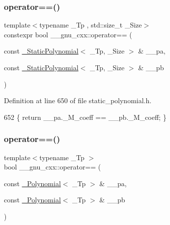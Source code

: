 \subsubsection{\texorpdfstring{operator==()}{operator==()}\hspace{0.1cm}{\footnotesize\ttfamily [2/3]}}
{\footnotesize\ttfamily template$<$typename \+\_\+\+Tp , std\+::size\+\_\+t \+\_\+\+Size$>$ \\
constexpr bool \+\_\+\+\_\+gnu\+\_\+cxx\+::operator== (\begin{DoxyParamCaption}\item[{const \hyperlink{class____gnu__cxx_1_1__StaticPolynomial}{\+\_\+\+Static\+Polynomial}$<$ \+\_\+\+Tp, \+\_\+\+Size $>$ \&}]{\+\_\+\+\_\+pa,  }\item[{const \hyperlink{class____gnu__cxx_1_1__StaticPolynomial}{\+\_\+\+Static\+Polynomial}$<$ \+\_\+\+Tp, \+\_\+\+Size $>$ \&}]{\+\_\+\+\_\+pb }\end{DoxyParamCaption})\hspace{0.3cm}{\ttfamily [inline]}}



Definition at line 650 of file static\+\_\+polynomial.\+h.


\begin{DoxyCode}
652     \{ \textcolor{keywordflow}{return} \_\_pa.\_M\_coeff == \_\_pb.\_M\_coeff; \}
\end{DoxyCode}
\mbox{\label{namespace____gnu__cxx_a7427db234bb8c8aab722a3196e898215}} 
\subsubsection{\texorpdfstring{operator==()}{operator==()}\hspace{0.1cm}{\footnotesize\ttfamily [3/3]}}
{\footnotesize\ttfamily template$<$typename \+\_\+\+Tp $>$ \\
bool \+\_\+\+\_\+gnu\+\_\+cxx\+::operator== (\begin{DoxyParamCaption}\item[{const \hyperlink{class____gnu__cxx_1_1__Polynomial}{\+\_\+\+Polynomial}$<$ \+\_\+\+Tp $>$ \&}]{\+\_\+\+\_\+pa,  }\item[{const \hyperlink{class____gnu__cxx_1_1__Polynomial}{\+\_\+\+Polynomial}$<$ \+\_\+\+Tp $>$ \&}]{\+\_\+\+\_\+pb }\end{DoxyParamCaption})\hspace{0.3cm}{\ttfamily [inline]}}

